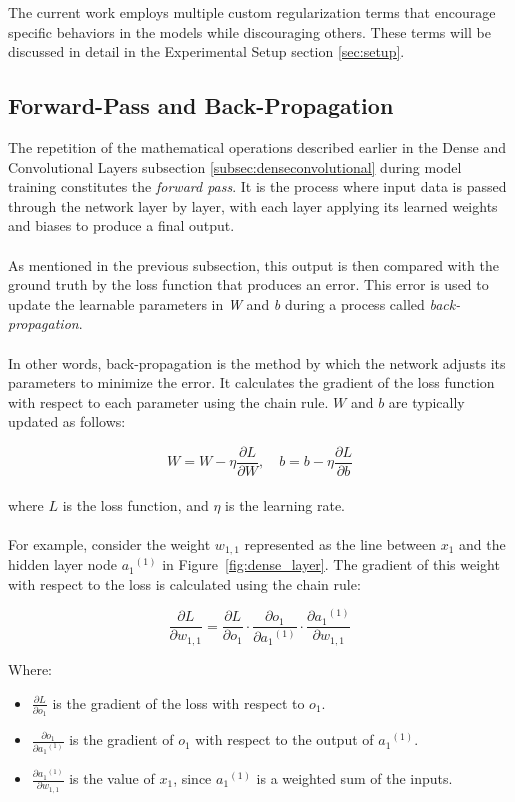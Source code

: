 \noindent The current work employs multiple custom regularization terms 
that encourage specific behaviors in the models while discouraging others. 
These terms will be discussed in detail in the Experimental Setup section \ref{sec:setup}.


\subsection{Forward-Pass and Back-Propagation}
\label{subsec:forwardback}
The repetition of the mathematical operations described earlier in the Dense and Convolutional Layers subsection \ref{subsec:denseconvolutional} 
during model training constitutes the \textit{forward pass}. 
It is the process where input data is passed through the network layer by layer, 
with each layer applying its learned weights and biases to produce a final output. 
\\
\\
As mentioned in the previous subsection, this output is then compared with the ground truth by the loss function that produces an error.
This error is used to update the learnable parameters in \textit{W} and \textit{b} during a process called \textit{back-propagation}.
\\
\\
In other words, back-propagation is the method by which the network adjusts its parameters to minimize the error. 
It calculates the gradient of the loss function with respect to each parameter using the chain rule. 
\( W \) and \( b \) are typically updated as follows:

\[
W = W - \eta \frac{\partial L}{\partial W}, \quad b = b - \eta \frac{\partial L}{\partial b}
\]
\\
\noindent where \( L \) is the loss function, and \( \eta \) is the learning rate.
\\
\\
For example, consider the weight \( w_{1,1} \) represented as the line between \( x_1 \)
 and the hidden layer node \( {a_1}^{(1)} \) in Figure~\ref{fig:dense_layer}. 
The gradient of this weight with respect to the loss is calculated using the chain rule:

\[
\frac{\partial L}{\partial w_{1,1}} = \frac{\partial L}{\partial o_1} \cdot \frac{\partial o_1}{\partial {a_1}^{(1)}} \cdot \frac{\partial {a_1}^{(1)}}{\partial w_{1,1}}
\]

\noindent Where:
\begin{itemize}
    \item \( \frac{\partial L}{\partial o_1} \) is the gradient of the loss with respect to \( o_1 \).
    \item \( \frac{\partial o_1}{\partial {a_1}^{(1)}} \) is the gradient of \( o_1 \) with respect to the output of \( {a_1}^{(1)} \).
    \item \( \frac{\partial {a_1}^{(1)} }{\partial w_{1,1}} \) is the value of  \( x_1 \), since  \( {a_1}^{(1)} \) is a weighted sum of the inputs.
\end{itemize}


